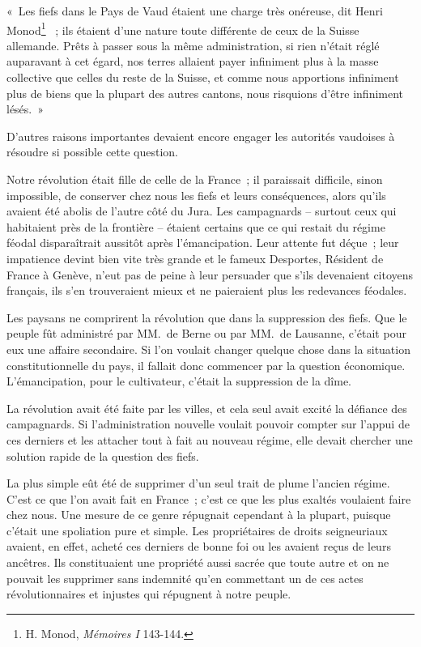 \documentclass[french,twoside]{book} %
\newenvironment{quoteblock}%
  {\begin{quoting}}
  {\end{quoting}}
\newenvironment{quotebar}{%
    \def\FrameCommand{{\color{rubric!10!}\vrule width 0.5em} \hspace{0.9em}}%
    \def\OuterFrameSep{\itemsep} %
    \MakeFramed {\advance\hsize-\width \FrameRestore}
  }%
  {%
    \endMakeFramed
  }
\renewenvironment{quoteblock}%
  {%
    \savenotes
    \setstretch{0.9}
    \normalfont
    \begin{quotebar}
  }
  {%
    \end{quotebar}
    \spewnotes
  }
\begin{document}
\begin{quoteblock}
 \noindent « Les fiefs dans le Pays de Vaud étaient une charge très onéreuse, dit Henri Monod\footnote{H. Monod, \emph{Mémoires I} 143-144.}  ; ils étaient d’une nature toute différente de ceux de la Suisse allemande. Prêts à passer sous la même administration, si rien n’était réglé auparavant à cet égard, nos terres allaient payer infiniment plus à la masse collective que celles du reste de la Suisse, et comme nous apportions infiniment plus de biens que la plupart des autres cantons, nous risquions d’être infiniment lésés. »
 \end{quoteblock}

\noindent D’autres raisons importantes devaient encore engager les autorités vaudoises à résoudre si possible cette question.\par
Notre révolution était fille de celle de la France ; il paraissait difficile, sinon impossible, de conserver chez nous les fiefs et leurs conséquences, alors qu’ils avaient été abolis de l’autre côté du Jura. Les campagnards – surtout ceux qui habitaient près de la frontière – étaient certains que ce qui restait du régime féodal disparaîtrait aussitôt après l’émancipation. Leur attente fut déçue ; leur impatience devint bien vite très grande et le fameux Desportes, Résident de France à Genève, n’eut pas de peine à leur persuader que s’ils devenaient citoyens français, ils s’en trouveraient mieux et ne paieraient plus les redevances féodales.\par
Les paysans ne comprirent la révolution que dans la suppression des fiefs. Que le peuple fût administré par MM. de Berne ou par MM. de Lausanne, c’était pour eux une affaire secondaire. Si l’on voulait changer quelque chose dans la situation constitutionnelle du pays, il fallait donc commencer par la question économique. L’émancipation, pour le cultivateur, c’était la suppression de la dîme.\par
La révolution avait été faite par les villes, et cela seul avait excité la défiance des campagnards. Si l’administration nouvelle voulait pouvoir compter sur l’appui de ces derniers et les attacher tout à fait au nouveau régime, elle devait chercher une solution rapide de la question des fiefs.\par
La plus simple eût été de supprimer d’un seul trait de plume l’ancien régime. C’est ce que l’on avait fait en France ; c’est ce que les plus exaltés voulaient faire chez nous. Une mesure de ce genre répugnait cependant à la plupart, puisque c’était une spoliation pure et simple. Les propriétaires de droits seigneuriaux avaient, en effet, acheté ces derniers de bonne foi ou les avaient reçus de leurs ancêtres. Ils constituaient une propriété aussi sacrée que toute autre et on ne pouvait les supprimer sans indemnité qu’en commettant un de ces actes révolutionnaires et injustes qui répugnent à notre peuple.\par
\end{document}
